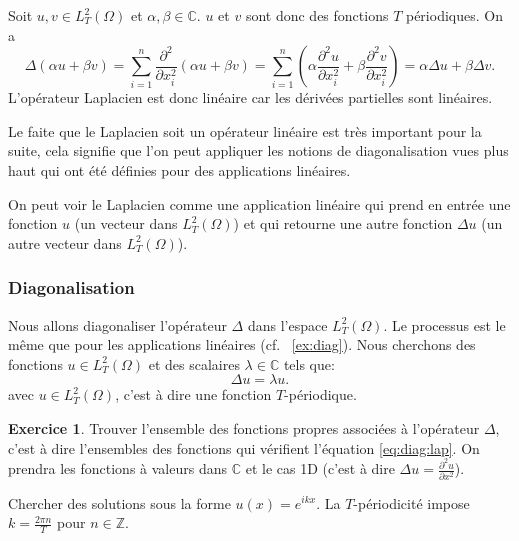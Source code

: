 \documentclass[11pt,a4paper]{article}
\numberwithin{equation}{section}
\theoremstyle{plain}
\theoremstyle{definition}
\newtheorem{exercise}[theorem]{Exercice}
\theoremstyle{remark}
\newcommand{\C}{\mathbb{C}}
\newcommand{\Z}{\mathbb{Z}}
\newcommand{\Lap}{\Delta}
\begin{document}
\begin{solution}
    Soit $u,v \in L^2_T(\Omega)$ et $\alpha,\beta \in \C$. $u$ et $v$ sont donc des fonctions $T$ périodiques. On a
    \[
        \Lap(\alpha u + \beta v) = \sum_{i=1}^n \frac{\partial^2}{\partial x_i^2}(\alpha u + \beta v) = \sum_{i=1}^n \left( \alpha \frac{\partial^2 u}{\partial x_i^2} + \beta \frac{\partial^2 v}{\partial x_i^2} \right) = \alpha \Lap u + \beta \Lap v.
    \]
    L'opérateur Laplacien est donc linéaire car les dérivées partielles sont linéaires.
\end{solution}

Le faite que le Laplacien soit un opérateur linéaire est très important pour la suite, cela signifie que l'on peut appliquer les notions de diagonalisation vues plus haut qui ont été définies pour des applications linéaires.

On peut voir le Laplacien comme une application linéaire qui prend en entrée une fonction $u$ (un vecteur dans $L^2_T(\Omega)$) et qui retourne une autre fonction $\Lap u$ (un autre vecteur dans $L^2_T(\Omega)$).

\subsubsection{Diagonalisation}

Nous allons diagonaliser l'opérateur $\Lap$ dans l'espace $L^2_T(\Omega)$. Le processus est le même que pour les applications linéaires (cf. ~\ref{ex:diag}).
Nous cherchons des fonctions $u \in L^2_T(\Omega)$ et des scalaires $\lambda \in \C$ tels que:
\[ \label{eq:diag:lap}
    \Lap u = \lambda u. 
\]
avec $u \in L^2_T(\Omega)$, c'est à dire une fonction $T$-périodique.

\begin{exercise}
    Trouver l'ensemble des fonctions propres associées à l'opérateur $\Lap$, c'est à dire l'ensembles des fonctions qui vérifient l'équation \eqref{eq:diag:lap}.
    On prendra les fonctions à valeurs dans $\C$ et le cas 1D (c'est à dire $\Lap u = \frac{\partial^2 u}{\partial x^2}$).
\end{exercise}

\begin{indication}
    Chercher des solutions sous la forme $u(x)=e^{ikx}$.
    La $T$-périodicité impose $k = \tfrac{2\pi n}{T}$ pour $n\in\Z$.
\end{indication}
\end{document}
